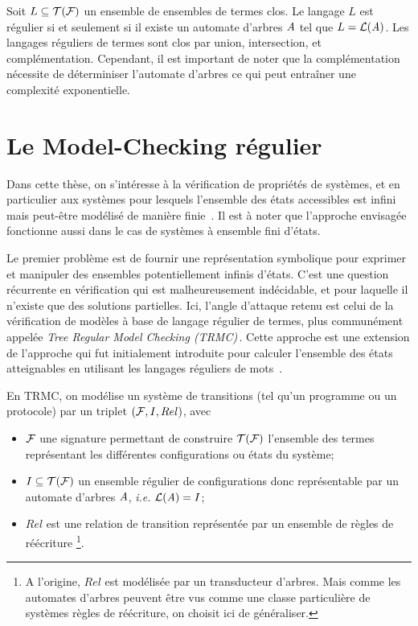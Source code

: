 Soit $L \subseteq \mathcal{T(F)}$ un ensemble de ensembles de termes clos. Le langage $L$ est régulier si et seulement si il existe
un automate d'arbres $\mathit A$ tel que $L = \mathcal{L}(\mathit A)$. Les langages réguliers de termes sont clos par union, intersection, et 
complémentation. Cependant, il est important de noter que la complémentation nécessite de déterminiser l'automate d'arbres
ce qui peut entraîner une complexité exponentielle.

\section{Le Model-Checking régulier}

Dans cette thèse, on s'intéresse à la vérification de propriétés de systèmes,
et en particulier aux systèmes pour lesquels l'ensemble des états accessibles
est infini mais peut-être modélisé de manière finie~\cite{WB98}. 
Il est à noter que l'approche envisagée fonctionne aussi 
dans le cas de systèmes à ensemble fini d'états.

Le premier problème est de fournir une représentation symbolique 
pour exprimer et manipuler des ensembles potentiellement infinis
d'états. C'est une question récurrente en vérification qui est malheureusement
indécidable, et pour laquelle il n'existe que des solutions partielles.
Ici, l'angle d'attaque retenu est celui de la vérification de modèles
à base de langage régulier de termes, plus communément appelée {\em Tree Regular Model Checking
  (TRMC)}\,\cite{ALRd05}. Cette approche est une extension de l'approche qui fut initialement introduite
pour calculer l'ensemble des états atteignables en utilisant les langages réguliers de mots~\cite{BJNT00,BLW03}.


En TRMC, on modélise un système de transitions (tel qu'un programme ou un protocole) par un triplet $(\mathcal{F}, I, Rel)$,
avec
\begin{itemize}
\item
$\mathcal{F}$ une signature permettant de construire $\mathcal{T(F)}$ l'ensemble des termes représentant les différentes configurations ou états
du système;

\item
  $I \subseteq \mathcal{T(F)}$ un ensemble régulier de configurations donc représentable par un automate d'arbres $\mathit A$, 
  \textit{i.e.} $\mathcal{L}(\mathit A)=I$;

\item $Rel$ est une relation de transition représentée par un ensemble de règles de réécriture
  \footnote{\footnotesize A l'origine, $Rel$ est modélisée par un transducteur d'arbres.
    Mais comme les automates d'arbres peuvent être vus comme une classe particulière de 
    systèmes règles de réécriture, on choisit ici de généraliser.}.
\end{itemize}

